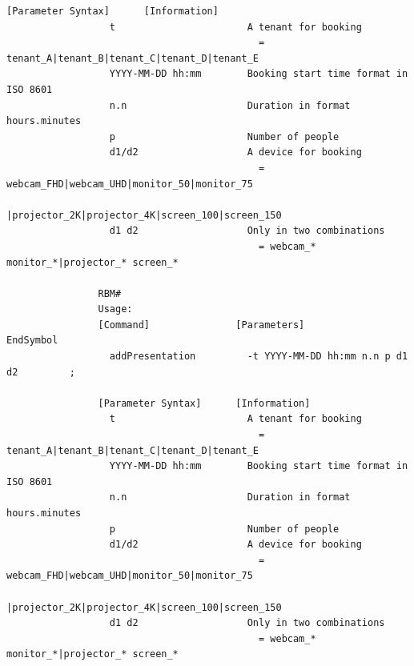 \documentclass{article}
\begin{document}
\begin{Verbatim}[gobble=8]
                [Parameter Syntax]      [Information]                                         
                  t                       A tenant for booking                                
                                            = tenant_A|tenant_B|tenant_C|tenant_D|tenant_E    
                  YYYY-MM-DD hh:mm        Booking start time format in ISO 8601               
                  n.n                     Duration in format hours.minutes                    
                  p                       Number of people                                    
                  d1/d2                   A device for booking                                
                                            = webcam_FHD|webcam_UHD|monitor_50|monitor_75     
                                              |projector_2K|projector_4K|screen_100|screen_150
                  d1 d2                   Only in two combinations                            
                                            = webcam_* monitor_*|projector_* screen_*         
                
                RBM# 
                Usage: 
                [Command]               [Parameters]                            EndSymbol     
                  addPresentation         -t YYYY-MM-DD hh:mm n.n p d1 d2         ;           
                
                [Parameter Syntax]      [Information]                                         
                  t                       A tenant for booking                                
                                            = tenant_A|tenant_B|tenant_C|tenant_D|tenant_E    
                  YYYY-MM-DD hh:mm        Booking start time format in ISO 8601               
                  n.n                     Duration in format hours.minutes                    
                  p                       Number of people                                    
                  d1/d2                   A device for booking                                
                                            = webcam_FHD|webcam_UHD|monitor_50|monitor_75     
                                              |projector_2K|projector_4K|screen_100|screen_150
                  d1 d2                   Only in two combinations                            
                                            = webcam_* monitor_*|projector_* screen_*         
                

\end{Verbatim}
\end{document}
